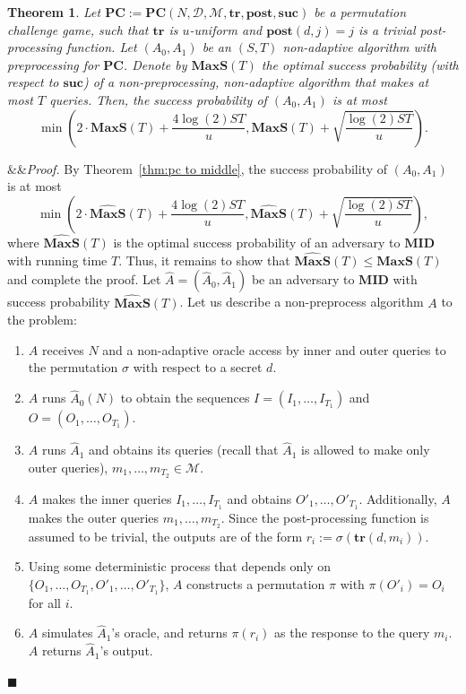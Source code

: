 \documentclass[11pt]{article}
\renewenvironment{proof}[1][]
    {\noindent
       \ifx&#1&{\it Proof.}
       \else{\it Proof ({#1}).}
       \fi}{\hfill $\blacksquare$}
\newtheorem{theorem}{Theorem}[section]
\newcommand{\SECS}{{\mathcal{D}}}
\newcommand{\secv}{{d}}
\newcommand{\SUC}{\boldsymbol{suc}}
\newcommand{\TR}{\boldsymbol{tr}}
\newcommand{\POST}{\boldsymbol{post}}
\newcommand{\PC}{\boldsymbol{PC}}
\newcommand{\MID}{\boldsymbol{MID}}
\newcommand{\INP}{I}
\newcommand{\OUTP}{O}
\newcommand{\MAXS}{\boldsymbol{MaxS}}
\begin{document}
\begin{theorem} \label{thm:g-nonadaptive no post}
Let $\PC := \PC(N,\SECS,\mathcal{M},\TR,\POST,\SUC)$ be a permutation challenge game, such that 
$\TR$ is $u$-uniform and $\POST(\secv,j)=j$ is a trivial post-processing function.
Let $(A_0,A_1)$ be an $(S,T)$ non-adaptive algorithm with preprocessing for $\PC$.
Denote by $\MAXS(T)$ the optimal success probability (with respect to $\SUC$) of a non-preprocessing, non-adaptive algorithm that makes at most $T$ queries.
Then, the success probability of $(A_0,A_1)$ is at most
\[
\min \left(2\cdot \MAXS(T) + \frac{4\log(2) S T }{u}, \MAXS(T) + 
\sqrt{\frac{\log(2) ST} {{u}}} \right).
\]
\end{theorem}

\begin{proof}
By Theorem~\ref{thm:pc to middle}, the success probability of $(A_0,A_1)$ is at most
\[
\min \left(2\cdot \widehat{\MAXS}(T) + \frac{4\log(2) S T }{u}, \widehat{\MAXS}(T) + 
\sqrt{\frac{\log(2) ST} {{u}}}\right),
\]
where $\widehat{\MAXS}(T)$ is the optimal success probability of an adversary to $\MID$ with running time $T$.
Thus, it remains to show that $\widehat{\MAXS}(T)\le \MAXS(T)$ and complete the proof. Let $\widehat{A} = (\widehat{A}_0,\widehat{A}_1)$ be an adversary to $\MID$ with success probability $\widehat{\MAXS}(T)$. Let us describe a non-preprocess algorithm $A$ to the problem:
\begin{enumerate}
    \item $A$ receives $N$ and a non-adaptive oracle access by inner and outer queries to the permutation $\sigma$ with respect to a secret $\secv$.
    \item $A$ runs $\widehat{A}_0(N)$ to obtain the sequences $\INP = (\INP_1,\dots,\INP_{T_1})$ and $\OUTP = (\OUTP_1,\dots,\OUTP_{T_1})$.
    \item $A$ runs $\widehat{A}_1$ and obtains its queries (recall that $\widehat{A}_1$ is allowed to make only outer queries), $m_1,\dots,m_{T_2} \in \mathcal{M}$.
    \item $A$ makes the inner queries $\INP_1,\dots,\INP_{T_1}$ and obtains $\OUTP'_1,\dots,\OUTP'_{T_1}$. Additionally, $A$ makes the outer queries $m_1,\dots,m_{T_2}$. Since the post-processing function is assumed to be trivial, the outputs are of the form $r_i := \sigma(\TR(\secv,m_i))$.
    \item Using some deterministic process that depends only on $\{\OUTP_1,\dots,\OUTP_{T_1},\OUTP'_1,\dots,\OUTP'_{T_1}\}$, $A$ constructs a permutation $\pi$ with $\pi(\OUTP'_i) = \OUTP_i$ for all $i$. 
    \item $A$ simulates $\widehat{A}_1$'s oracle, and returns $\pi(r_i)$ as the response to the query $m_i$. $A$ returns $\widehat{A}_1$'s output.
\end{enumerate}


\end{proof}
\end{document}
